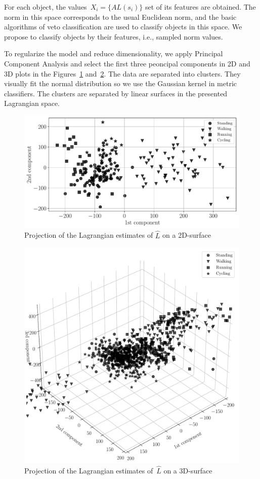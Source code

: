 \documentclass[12pt]{paper}
\begin{document}
For each object, the values~$X_i = \{AL(s_i)\}$ set of its features are obtained. The norm in this space corresponds to the usual Euclidean norm, and the basic algorithms of veto classification are used to classify objects in this space. We propose to classify objects by their features, i.e.,
sampled norm values.

To regularize the model and reduce dimensionality, we apply Principal Component Analysis and select the first three peoncipal components in 2D and 3D plots in the Figures~\ref{fig:2D} and~\ref{fig:3D}. 
The data are separated into clusters. They visually fit the normal distribution so we use the Gaussian kernel in metric classifiers. The clusters are separated by linear surfaces in the presented Lagrangian space. 

\begin{figure}[!htbp]
\centering\includegraphics[scale = 0.5]{Data.pdf}
\caption{Projection of the Lagrangian estimates of $\hat{L}$ on a 2D-surface}
\label{fig:2D}
\end{figure}

\begin{figure}[!htbp]
\centering\includegraphics[scale = 0.4]{Data_3D.pdf}
\caption{Projection of the Lagrangian estimates of~$\hat{L}$ on a 3D-surface}
\label{fig:3D}
\end{figure}
\end{document}
